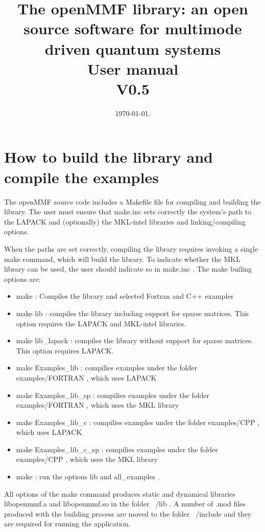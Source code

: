 \documentclass[10pt,a4paper]{article}
\title{The openMMF library: an open source software for multimode driven quantum systems \\ User manual \\ V0.5}
\date{\today.}
\begin{document}
\maketitle
\tableofcontents

\section{How to build the library and compile the examples}

The openMMF source code includes a   Makefile file for compiling and building the library. The user must ensure that   make.inc  sets correctly the system's path to the LAPACK and (optionally) the MKL-intel libraries and linking/compiling options. 

When the paths are set correctly, compiling the library requires invoking a single   make  command, which will build the library. To indicate whether the MKL library can be used, the user should indicate so in   make.inc  . The   make  builing options are:

\begin{itemize}
\item   make            :  Compiles the library and selected Fortran and C++ examples 
\item   make    lib :  compiles the library including support for sparse matrices. This option requires the LAPACK and MKL-intel libraries.
\item   make    lib\_lapack : compiles the library without support for sparse matrices. This option requires LAPACK.
\item   make    Examples\_lib : compilies examples under the folder   examples/FORTRAN , which uses LAPACK
\item   make    Examples\_lib\_sp : compilies examples under the folder   examples/FORTRAN , which uses the MKL library
\item   make    Examples\_lib\_c : compilies examples under the folder   examples/CPP  , which uses LAPACK
\item   make    Examples\_lib\_c\_sp : compilies examples under the folder   examples/CPP , which uses the MKL library
\item   make  : run the options   lib   and   all\_examples .
\end{itemize} 
All options of the   make   command produces static and dynamical libraries   libopenmmf.a  and   libopenmmf.so  in the folder   ~/lib . A number of   .mod  files produced with the building process are moved to the folder   ~/include   and they are required for running the  application.
\end{document}
